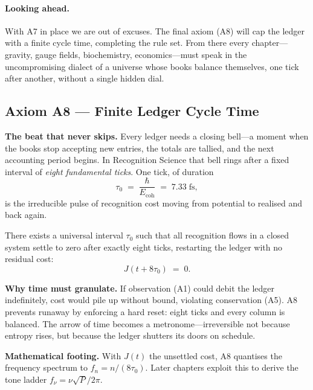 \documentclass[11pt,oneside]{book}
\begin{document}
\paragraph*{Looking ahead.}
With A7 in place we are out of excuses.  
The final axiom (A8) will cap the ledger with a finite cycle time,
completing the rule set.  
From there every chapter—gravity, gauge fields, biochemistry,
economics—must speak in the uncompromising dialect of a universe whose
books balance themselves, one tick after another, without a single
hidden dial.

\subsection*{Axiom A8 — Finite Ledger Cycle Time}

\textbf{The beat that never skips.}  
Every ledger needs a closing bell—a moment when the books stop accepting
new entries, the totals are tallied, and the next accounting period
begins.  
In Recognition Science that bell rings after a fixed interval of
\emph{eight fundamental ticks}.  
One tick, of duration
\[
   \tau_{0} \;=\; \frac{\hbar}{E_{\text{coh}}}
                \;=\; 7.33\;\text{fs},
\]
is the irreducible pulse of recognition cost moving from potential to
realised and back again.

\begin{axiom}
\label{ax:A8}
There exists a universal interval $\tau_0$ such that all recognition
flows in a closed system settle to zero after exactly eight ticks,
restarting the ledger with no residual cost:
\[
   J(t+8\tau_0) \;=\; 0 .
\]
\end{axiom}

\textbf{Why time must granulate.}  
If observation (A1) could debit the ledger indefinitely, cost would pile
up without bound, violating conservation (A5).  
A8 prevents runaway by enforcing a hard reset: eight ticks and every
column is balanced.  
The arrow of time becomes a metronome—irreversible not because entropy
rises, but because the ledger shutters its doors on schedule.

\textbf{Mathematical footing.}  
With $J(t)$ the unsettled cost, A8 quantises the frequency spectrum to
\(f_n = n/(8\tau_0)\).  
Later chapters exploit this to derive the tone ladder
\(f_\nu = \nu\sqrt{P}/2\pi\).
\end{document}
